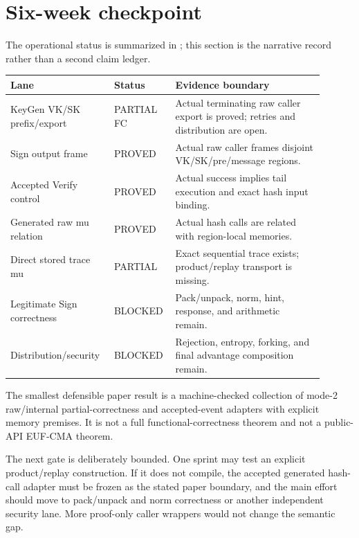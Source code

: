 \section{Six-week checkpoint}

The operational status is summarized in
; this section is the narrative record rather than a
second claim ledger.

\begin{center}
\small
\begin{tabular}{p{0.29\linewidth}p{0.16\linewidth}p{0.45\linewidth}}
\toprule
Lane & Status & Evidence boundary \\
\midrule
KeyGen VK/SK prefix/export & PARTIAL FC & Actual terminating raw caller export is proved; retries and distribution are open. \\
Sign output frame & PROVED & Actual raw caller frames disjoint VK/SK/pre/message regions. \\
Accepted Verify control & PROVED & Actual success implies tail execution and exact hash input binding. \\
Generated raw mu relation & PROVED & Actual hash calls are related with region-local memories. \\
Direct stored trace mu & PARTIAL & Exact sequential trace exists; product/replay transport is missing. \\
Legitimate Sign correctness & BLOCKED & Pack/unpack, norm, hint, response, and arithmetic remain. \\
Distribution/security & BLOCKED & Rejection, entropy, forking, and final advantage composition remain. \\
\bottomrule
\end{tabular}
\end{center}

The smallest defensible paper result is a machine-checked collection of
mode-2 raw/internal partial-correctness and accepted-event adapters with
explicit memory premises. It is not a full functional-correctness theorem and
not a public-API EUF-CMA theorem.

The next gate is deliberately bounded. One sprint may test an explicit
product/replay construction. If it does not compile, the accepted generated
hash-call adapter must be frozen as the stated paper boundary, and the main
effort should move to pack/unpack and norm correctness or another independent
security lane. More proof-only caller wrappers would not change the semantic
gap.

